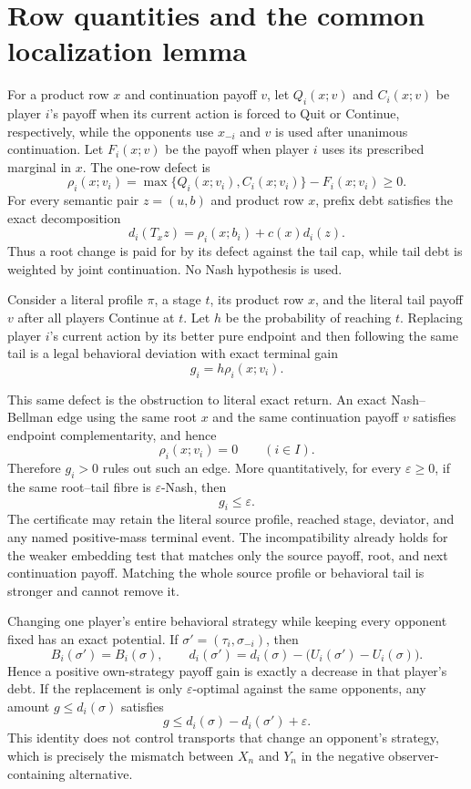\documentclass[11pt]{article}
\begin{document}
\section{Row quantities and the common localization lemma}

For a product row $x$ and continuation payoff $v$, let $Q_i(x;v)$ and
$C_i(x;v)$ be player $i$'s payoff when its current action is forced to Quit or
Continue, respectively, while the opponents use $x_{-i}$ and $v$ is used
after unanimous continuation.  Let $F_i(x;v)$ be the payoff when player $i$
uses its prescribed marginal in $x$.  The one-row defect is
\[
 \rho_i(x;v_i)=\max\{Q_i(x;v_i),C_i(x;v_i)\}-F_i(x;v_i)\ge0.
\]
For every semantic pair $z=(u,b)$ and product row $x$, prefix debt satisfies
the exact decomposition
\[
 d_i(T_xz)=\rho_i(x;b_i)+c(x)d_i(z).
\]
Thus a root change is paid for by its defect against the tail cap, while tail
debt is weighted by joint continuation.  No Nash hypothesis is used.

Consider a literal profile $\pi$, a stage $t$, its product row $x$, and the
literal tail payoff $v$ after all players Continue at $t$.  Let $h$ be the
probability of reaching $t$.  Replacing player $i$'s current action by its
better pure endpoint and then following the same tail is a legal behavioral
deviation with exact terminal gain
\[
 g_i=h\rho_i(x;v_i).
\]

This same defect is the obstruction to literal exact return.  An exact
Nash--Bellman edge using the same root $x$ and the same continuation payoff
$v$ satisfies endpoint complementarity, and hence
\[
 \rho_i(x;v_i)=0\qquad(i\in I).
\]
Therefore $g_i>0$ rules out such an edge.  More quantitatively, for every
$\varepsilon\ge0$, if the same root--tail fibre is $\varepsilon$-Nash, then
\[
 g_i\le\varepsilon.
\]
The certificate may retain the literal source profile, reached stage, deviator,
and any named positive-mass terminal event.  The incompatibility already
holds for the weaker embedding test that matches only the source payoff,
root, and next continuation payoff.  Matching the whole source profile or
behavioral tail is stronger and cannot remove it.

Changing one player's entire behavioral strategy while keeping every opponent
fixed has an exact potential.  If $\sigma'=(\tau_i,\sigma_{-i})$, then
\[
 B_i(\sigma')=B_i(\sigma),
 \qquad
 d_i(\sigma')=d_i(\sigma)-
   \bigl(U_i(\sigma')-U_i(\sigma)\bigr).
\]
Hence a positive own-strategy payoff gain is exactly a decrease in that
player's debt.  If the replacement is only $\varepsilon$-optimal against the
same opponents, any amount $g\le d_i(\sigma)$ satisfies
\[
 g\le d_i(\sigma)-d_i(\sigma')+\varepsilon.
\]
This identity does not control transports that change an opponent's
strategy, which is precisely the mismatch between $X_n$ and $Y_n$ in the
negative observer-containing alternative.
\end{document}
